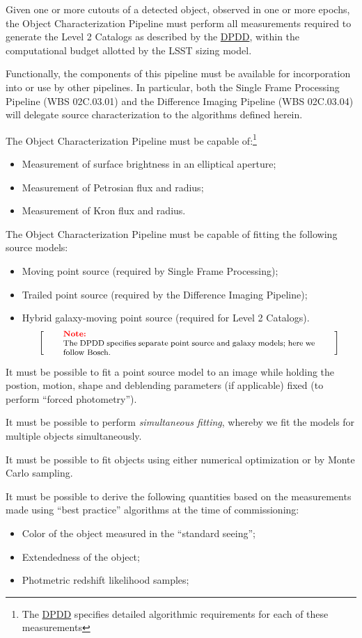 \documentclass[12pt]{article}
\newcommand{\ds}[2]{{\color{blue} \href{https://docushare.lsstcorp.org/docushare/dsweb/Get/#1}{#2}}\xspace}
\newcommand{\DPDD}{\ds{LSE-163}{DPDD}}
\newcommand{\wbsSFM}{WBS 02C.03.01}
\newcommand{\wbsDiffim}{WBS 02C.03.04}
\newenvironment{note}[1][Note]
{
  \begin{displaymath}
    \left[ \qquad
    \begin{minipage}[h]{.75\linewidth}
      \color{red} \footnotesize
      \textbf{#1:} \newline
      \color{black}
}
{
    \end{minipage}
    \normalsize
    \qquad \right]
  \end{displaymath}
}
\begin{document}
Given one or more cutouts of a detected object, observed in one or more epochs, the Object Characterization Pipeline must perform all measurements required to generate the Level 2 Catalogs as described by the \DPDD{}, within the computational budget allotted by the LSST sizing model.

Functionally, the components of this pipeline must be available for incorporation into or use by other pipelines. In particular, both the Single Frame Processing Pipeline (\wbsSFM) and the Difference Imaging Pipeline (\wbsDiffim) will delegate source characterization to the algorithms defined herein.

The Object Characterization Pipeline must be capable of:\footnote{The \DPDD{} specifies detailed algorithmic requirements for each of these measurements}
\begin{itemize}
  \item{Measurement of surface brightness in an elliptical aperture;}
  \item{Measurement of Petrosian flux and radius;}
  \item{Measurement of Kron flux and radius.}
\end{itemize}

The Object Characterization Pipeline must be capable of fitting the following source models:
\begin{itemize}
  \item{Moving point source (required by Single Frame Processing);}
  \item{Trailed point source (required by the Difference Imaging Pipeline);}
  \item{Hybrid galaxy-moving point source (required for Level 2 Catalogs).
    \begin{note}
    The DPDD specifies separate point source and galaxy models; here we follow Bosch.
    \end{note}
  }
\end{itemize}

It must be possible to fit a point source model to an image while holding the postion, motion, shape and deblending parameters (if applicable) fixed (to perform ``forced photometry'').

It must be possible to perform \textit{simultaneous fitting}, whereby we fit the models for multiple objects simultaneously.

It must be possible to fit objects using either numerical optimization or by Monte Carlo sampling.

It must be possible to derive the following quantities based on the measurements made using ``best practice'' algorithms at the time of commissioning:
\begin{itemize}
  \item{Color of the object measured in the ``standard seeing'';}
  \item{Extendedness of the object;}
  \item{Photmetric redshift likelihood samples;}
\end{itemize}
\end{document}
